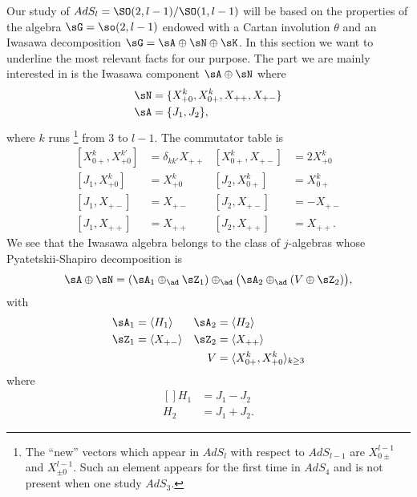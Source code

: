 Our study of $AdS_l=\SO(2,l-1)/\SO(1,l-1)$ will be based on the properties of the algebra $\sG=\so(2,l-1)$ endowed with a Cartan involution $\theta$ and an Iwasawa decomposition $\sG=\sA\oplus\sN\oplus\sK$. In this section we want to underline the most relevant facts for our purpose. The part we are mainly interested in is the Iwasawa component $\sA\oplus\sN$ where
\begin{subequations}		\label{LONGEqLeANEnDimAlg}
\begin{align}
	\sN&=\{ X^{k}_{+0},X^{k}_{0+},X_{++},X_{+-} \}\\
	\sA&=\{ J_1, J_2\},
\end{align}
\end{subequations}
where $k$ runs %
\footnote{The ``new'' vectors which appear in $AdS_l$ with respect to $AdS_{l-1}$ are $X_{0\pm}^{l-1}$ and $X_{\pm 0}^{l-1}$. Such an element appears for the first time in $AdS_4$ and is not present when one study $AdS_3$.} %
from $3$ to $l-1$. The commutator table is
\begin{subequations}  \label{LONGEqTableSOIwa}
	\begin{align}
		[X_{0+}^{k},X_{+0}^{k'}]&=\delta_{kk'}X_{++}		&[X_{0+}^{k},X_{+-}]&=2X_{+0}^{k}\\
		[ J_1,X_{+0}^{k}]&=X_{+0}^{k}				&[ J_2,X_{0+}^{k}]&=X_{0+}^{k}\\
		[ J_1,X_{+-}]&=X_{+-}					&[ J_2,X_{+-}]&=-X_{+-}\\
		[ J_1,X_{++}]&=X_{++}					&[ J_2,X_{++}]&=X_{++}.
	\end{align}
\end{subequations}
We see that the Iwasawa algebra belongs to the class of $j$-algebras whose Pyatetskii-Shapiro decomposition is 
\begin{equation}
	\sA\oplus\sN=(\sA_1\oplus_{\ad}\sZ_1)\oplus_{\ad}\big( \sA_2\oplus_{\ad}(V\oplus \sZ_2) \big),
\end{equation}
with
\begin{subequations}
	\begin{align}
		\sA_1&=\langle H_1\rangle		&\sA_2&=\langle H_2\rangle\\
		\sZ_1&=\langle X_{+-}\rangle		&\sZ_2&=\langle X_{++}\rangle\\
		&					&V&=\langle X_{0+}^{k},X_{+0}^{k}\rangle_{k\geq 3}
	\end{align}
\end{subequations}
where 
\begin{equation}
	\begin{aligned}[]
		H_1&=J_1-J_2\\
		H_2&=J_1+J_2.
	\end{aligned}
\end{equation}

